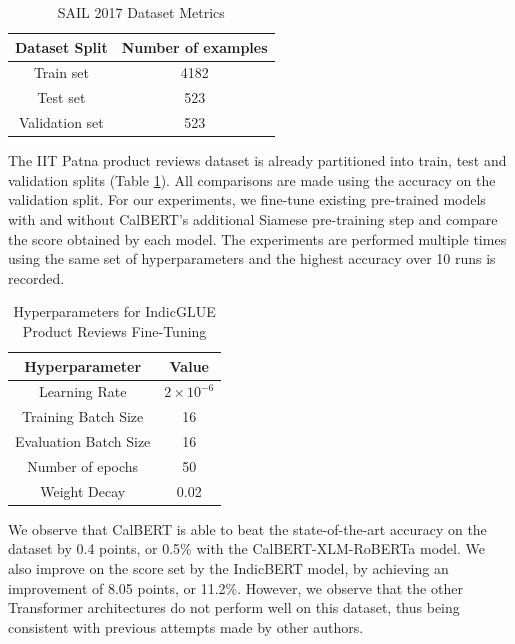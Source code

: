 \documentclass[conference]{IEEEtran}
\begin{document}
\begin{table}[htpb]
    \centering
    \caption{SAIL 2017 Dataset Metrics}
    \label{tab:iitp_product_dataset}
    \begin{tabular}{|c|c|}
    \hline 
        \textbf{Dataset Split} & \textbf{Number of examples} \\
    \hline
        Train set & 4182 \\
    \hline
        Test set & 523 \\
    \hline
        Validation set & 523 \\
    \hline
    \end{tabular}
\end{table}


The IIT Patna product reviews dataset is already partitioned into train, test and validation splits (Table \ref{tab:iitp_product_dataset}). All comparisons are made using the accuracy on the validation split. For our experiments, we fine-tune existing pre-trained models with and without CalBERT's additional Siamese pre-training step and compare the score obtained by each model. The experiments are performed multiple times using the same set of hyperparameters and the highest accuracy over 10 runs is recorded.

\begin{table}[htbp]
    \centering
    \caption{Hyperparameters for IndicGLUE Product Reviews Fine-Tuning}
    \label{tab:finetuning_hyperparams_indicglue}
    \begin{tabular}{|c|c|}
    \hline
        \textbf{Hyperparameter} & \textbf{Value}  \\
    \hline
        Learning Rate & $2 \times 10^{-6}$ \\
    \hline 
        Training Batch Size & 16 \\
    \hline 
        Evaluation Batch Size & 16 \\
    \hline 
        Number of epochs & 50 \\
    \hline 
        Weight Decay & 0.02 \\
    \hline
    \end{tabular}
\end{table}

We observe that CalBERT is able to beat the state-of-the-art accuracy on the dataset by 0.4 points, or 0.5\% with the CalBERT-XLM-RoBERTa model. We also improve on the score set by the IndicBERT model, by achieving an improvement of 8.05 points, or 11.2\%. However, we observe that the other Transformer architectures do not perform well on this dataset, thus being consistent with previous attempts made by other authors\cite{b17}.  
\end{document}
